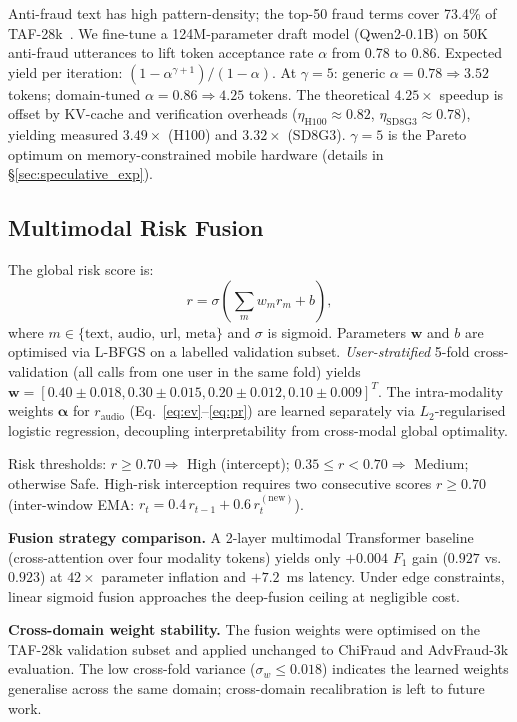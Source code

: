 \documentclass[lettersize,journal]{IEEEtran}
\begin{document}
Anti-fraud text has high pattern-density; the top-50 fraud terms
cover 73.4\% of TAF-28k~\cite{1}.  We fine-tune a 124M-parameter draft
model (Qwen2-0.1B) on 50K anti-fraud utterances to lift token
acceptance rate $\alpha$ from 0.78 to 0.86.  Expected yield per
iteration: $(1-\alpha^{\gamma+1})/(1-\alpha)$.  At $\gamma=5$:
generic $\alpha=0.78 \Rightarrow 3.52$ tokens; domain-tuned
$\alpha=0.86 \Rightarrow 4.25$ tokens.  The theoretical $4.25\times$
speedup is offset by KV-cache and verification overheads
($\eta_{\text{H100}}\approx 0.82$, $\eta_{\text{SD8G3}}\approx 0.78$),
yielding measured $3.49\times$ (H100) and $3.32\times$ (SD8G3).
$\gamma=5$ is the Pareto optimum on memory-constrained mobile hardware
(details in \S\ref{sec:speculative_exp}).

\subsection{Multimodal Risk Fusion}
\label{sec:fusion}

The global risk score is:
\begin{equation}
  r = \sigma\!\left(\sum_{m} w_m r_m + b\right),
  \label{eq:fusion}
\end{equation}
where $m \in \{\text{text, audio, url, meta}\}$ and $\sigma$ is
sigmoid.  Parameters $\mathbf{w}$ and $b$ are optimised via L-BFGS on
a labelled validation subset.  \emph{User-stratified} 5-fold
cross-validation (all calls from one user in the same fold) yields
$\mathbf{w} = [0.40\pm0.018, 0.30\pm0.015, 0.20\pm0.012,
0.10\pm0.009]^T$.  The intra-modality weights $\bm{\alpha}$ for
$r_{\mathrm{audio}}$ (Eq.~\eqref{eq:ev}--\eqref{eq:pr}) are learned
separately via $L_2$-regularised logistic regression, decoupling
interpretability from cross-modal global optimality.

Risk thresholds: $r\ge 0.70 \Rightarrow$ High (intercept);
$0.35\le r < 0.70 \Rightarrow$ Medium; otherwise Safe.  High-risk
interception requires two consecutive scores $r \ge 0.70$
(inter-window EMA: $r_t = 0.4\,r_{t-1} + 0.6\,r_t^{(\mathrm{new})}$).

\textbf{Fusion strategy comparison.} A 2-layer multimodal Transformer
baseline (cross-attention over four modality tokens) yields only
$+0.004$ $F_1$ gain ($0.927$ vs.\ $0.923$) at $42\times$ parameter
inflation and $+7.2$~ms latency.  Under edge constraints, linear
sigmoid fusion approaches the deep-fusion ceiling at negligible cost.

\textbf{Cross-domain weight stability.} The fusion weights were
optimised on the TAF-28k validation subset and applied unchanged to
ChiFraud and AdvFraud-3k evaluation.  The low cross-fold variance
($\sigma_w \le 0.018$) indicates the learned weights generalise across
the same domain; cross-domain recalibration is left to future work.
\end{document}

